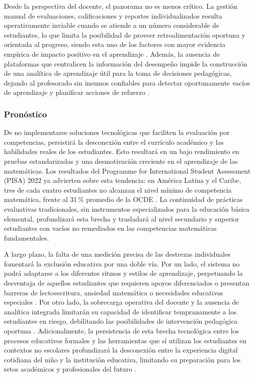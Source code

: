 Desde la perspectiva del docente, el panorama no es menos crítico. La gestión manual de evaluaciones, calificaciones y reportes individualizados resulta operativamente inviable cuando se atiende a un número considerable de estudiantes, lo que limita la posibilidad de proveer retroalimentación oportuna y orientada al progreso, siendo esta uno de los factores con mayor evidencia empírica de impacto positivo en el aprendizaje \cite{hattie2007feedback,maskos2025fa}. Además, la ausencia de plataformas que centralicen la información del desempeño impide la construcción de una analítica de aprendizaje útil para la toma de decisiones pedagógicas, dejando al profesorado sin insumos confiables para detectar oportunamente vacíos de aprendizaje y planificar acciones de refuerzo \cite{gonzalez2021ai,maksimchuk2025genai}.

\subsubsection{Pronóstico}

De no implementarse soluciones tecnológicas que faciliten la evaluación por competencias, persistirá la desconexión entre el currículo académico y las habilidades reales de los estudiantes. Esto resultará en un bajo rendimiento en pruebas estandarizadas y una desmotivación creciente en el aprendizaje de las matemáticas. Los resultados del Programme for International Student Assessment (PISA) 2022 ya advierten sobre esta tendencia: en América Latina y el Caribe, tres de cada cuatro estudiantes no alcanzan el nivel mínimo de competencia matemática, frente al 31\,\% promedio de la OCDE \cite{oecd2023pisa,bid2023pisa,unesco2024lac}. La continuidad de prácticas evaluativas tradicionales, sin instrumentos especializados para la educación básica elemental, profundizará esta brecha y trasladará al nivel secundario y superior estudiantes con vacíos no remediados en las competencias matemáticas fundamentales.

A largo plazo, la falta de una medición precisa de las destrezas individuales fomentará la exclusión educativa por una doble vía. Por un lado, el sistema no podrá adaptarse a los diferentes ritmos y estilos de aprendizaje, perpetuando la desventaja de aquellos estudiantes que requieren apoyos diferenciados o presentan barreras de lectoescritura, ansiedad matemática o necesidades educativas especiales \cite{passolunghi2016math,guillomia2021cognitive}. Por otro lado, la sobrecarga operativa del docente y la ausencia de analítica integrada limitarán su capacidad de identificar tempranamente a los estudiantes en riesgo, debilitando las posibilidades de intervención pedagógica oportuna \cite{hattie2007feedback,maskos2025fa}. Adicionalmente, la persistencia de esta brecha tecnológica entre los procesos educativos formales y las herramientas que sí utilizan los estudiantes en contextos no escolares profundizará la desconexión entre la experiencia digital cotidiana del niño y la institución educativa, limitando su preparación para los retos académicos y profesionales del futuro \cite{voinea2025competency,unesco2022contract}.

